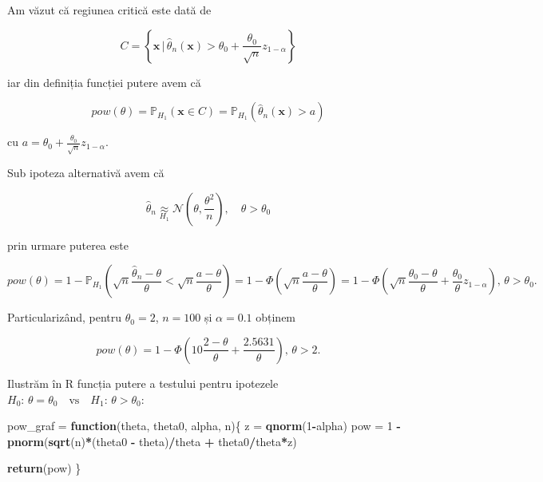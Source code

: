\documentclass[]{article}
\newenvironment{Shaded}{\begin{snugshade}}{\end{snugshade}}
\newcommand{\ControlFlowTok}[1]{\textcolor[rgb]{0.13,0.29,0.53}{\textbf{#1}}}
\newcommand{\DecValTok}[1]{\textcolor[rgb]{0.00,0.00,0.81}{#1}}
\newcommand{\KeywordTok}[1]{\textcolor[rgb]{0.13,0.29,0.53}{\textbf{#1}}}
\newcommand{\NormalTok}[1]{#1}
\newcommand{\OperatorTok}[1]{\textcolor[rgb]{0.81,0.36,0.00}{\textbf{#1}}}
\newcommand{\StringTok}[1]{\textcolor[rgb]{0.31,0.60,0.02}{#1}}
\begin{document}
Am văzut că regiunea critică este dată de

\[
 C = \left\{\mathbf{x}\,|\,\hat{\theta}_n(\mathbf{x}) > \theta_0 + \frac{\theta_0}{\sqrt{n}}z_{1-\alpha}\right\}
\]

iar din definiția funcției putere avem că

\[
 pow(\theta) = \mathbb{P}_{H_1}(\mathbf{x}\in C) = \mathbb{P}_{H_1}(\hat{\theta}_n(\mathbf{x}) > a)
\]

cu \(a = \theta_0 + \frac{\theta_0}{\sqrt{n}}z_{1-\alpha}\).

Sub ipoteza alternativă avem că

\[
  \hat{\theta}_n \underset{H_1}{\approx} \mathcal{N}\left(\theta, \frac{\theta^2}{n}\right),\quad \theta>\theta_0
\]

prin urmare puterea este

\[
  pow(\theta) = 1 - \mathbb{P}_{H_1}\left(\sqrt{n}\frac{\hat{\theta}_n - \theta}{\theta}<\sqrt{n}\frac{a - \theta}{\theta}\right) = 1 - \Phi\left(\sqrt{n}\frac{a - \theta}{\theta}\right) = 1 - \Phi\left(\sqrt{n}\frac{\theta_0 - \theta}{\theta} + \frac{\theta_0}{\theta}z_{1-\alpha}\right),\, \theta>\theta_0.
\]

Particularizând, pentru \(\theta_0 = 2\), \(n = 100\) și
\(\alpha = 0.1\) obținem

\[
  pow(\theta) = 1 - \Phi\left(10\frac{2 - \theta}{\theta} + \frac{2.5631}{\theta}\right),\, \theta>2.
\]

Ilustrăm în R funcția putere a testului pentru ipotezele
\(H_0:\, \theta = \theta_0 \quad \text{vs}\quad H_1:\, \theta > \theta_0\):

\begin{Shaded}
\begin{Highlighting}[]
\NormalTok{pow_graf =}\StringTok{ }\ControlFlowTok{function}\NormalTok{(theta, theta0, alpha, n)\{}
\NormalTok{  z =}\StringTok{ }\KeywordTok{qnorm}\NormalTok{(}\DecValTok{1}\OperatorTok{-}\NormalTok{alpha)}
\NormalTok{  pow =}\StringTok{ }\DecValTok{1} \OperatorTok{-}\StringTok{ }\KeywordTok{pnorm}\NormalTok{(}\KeywordTok{sqrt}\NormalTok{(n)}\OperatorTok{*}\NormalTok{(theta0 }\OperatorTok{-}\StringTok{ }\NormalTok{theta)}\OperatorTok{/}\NormalTok{theta }\OperatorTok{+}\StringTok{ }\NormalTok{theta0}\OperatorTok{/}\NormalTok{theta}\OperatorTok{*}\NormalTok{z)}
  
  \KeywordTok{return}\NormalTok{(pow)}
\NormalTok{\}}
\end{Highlighting}
\end{Shaded}
\end{document}
